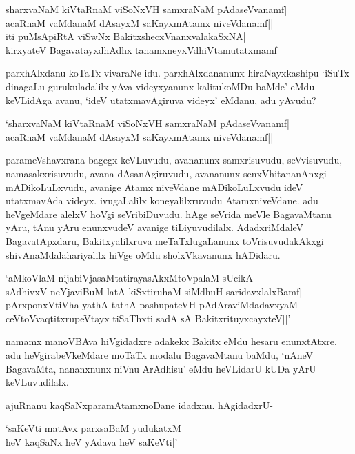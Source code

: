 \begin{shloka}
sharxvaNaM kiVtaRnaM viSoNxVH samxraNaM pAdaseVvanamf|\\
acaRnaM vaMdanaM dAsayxM saKayxmAtamx niveVdanamf||\\
iti puMsApiRtA viSwNx BakitxshecxVnanxvalakaSxNA|\\
kirxyateV BagavatayxdhAdhx tanamxneyxV\s dhiVtamutatxmamf||
\end{shloka}

parxhAlxdanu koTaTx vivaraNe idu. parxhAlxdananunx hiraNayxkashipu `iSuTx dinagaLu gurukuladalilx yAva videyxyanunx kalitukoMDu 
baMde' eMdu keVLidAga avanu, `ideV utatxmavAgiruva videyx' eMdanu, adu yAvudu?

\begin{shloka}
`sharxvaNaM kiVtaRnaM viSoNxVH samxraNaM pAdaseVvanamf|\\
acaRnaM vaMdanaM dAsayxM saKayxmAtamx niveVdanamf||
\end{shloka}

parameVshavxrana bagegx keVLuvudu, avananunx samxrisuvudu, seVvisuvudu, namasakxrisuvudu, avana dAsanAgiruvudu, avananunx senxVhitananAnxgi mADikoLuLxvudu, avanige Atamx niveVdane mADikoLuLxvudu ideV utatxmavAda videyx. ivugaLalilx koneyalilxruvudu AtamxniveVdane. adu heVgeMdare alelxV hoVgi seVribiDuvudu. 
hAge seVrida meVle BagavaMtanu yAru, tAnu yAru enunxvudeV avanige tiLiyuvudilalx. AdadxriMdaleV BagavatApxdaru, Bakitxyalilxruva meTaTxlugaLanunx 
toVrisuvudakAkxgi shivAnaMdalahariyalilx hiVge oMdu sholxVkavanunx hADidaru.

\begin{shloka}
`aMkoVlaM nijabiVjasaMtatirayasAkxMtoVpalaM sUcikA\\
sAdhivxV neYjaviBuM latA kiSxtiruhaM siMdhuH saridavxlalxBamf|\\
pArxponxVtiVha yathA tathA pashupateVH pAdAraviMdadavxyaM\\
ceVtoVvaqtitxrupeVtayx tiSaThxti sadA sA BakitxrituyxcayxteV||'
\end{shloka}

namamx manoVBAva hiVgidadxre adakekx Bakitx eMdu hesaru enunxtAtxre. adu heVgirabeVkeMdare moTaTx modalu BagavaMtanu baMdu, `nAneV BagavaMta, 
nananxnunx niVnu ArAdhisu' eMdu heVLidarU kUDa yArU keVLuvudilalx. 

ajuRnanu kaqSaNxparamAtamxnoDane idadxnu. hAgidadxrU-

\begin{shloka}
`saKeVti matAvx parxsaBaM yudukatxM\\
heV kaqSaNx heV yAdava heV saKeVti|'
\end{shloka}

